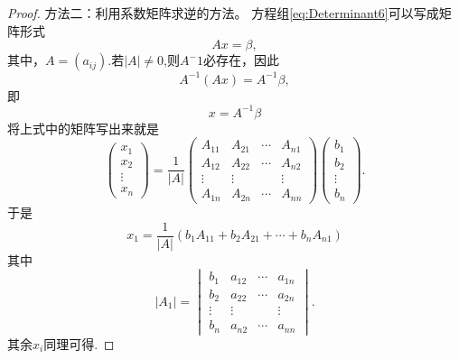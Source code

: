 \begin{proof}
  方法二：利用系数矩阵求逆的方法。
  方程组\eqref{eq:Determinant6}可以写成矩阵形式
  \begin{equation*}
    Ax=\beta,
  \end{equation*}
  其中，$A=(a_{ij})$.若$|A| \neq 0$,则$A^-1$必存在，因此
  \begin{equation*}
    A^{-1}(Ax)=A^{-1}\beta, 
  \end{equation*}
  即
  \begin{equation*}
    x=A^{-1}\beta
  \end{equation*}
  将上式中的矩阵写出来就是
  \begin{equation*}
    \begin{pmatrix}
      x_1\\
      x_2\\
      \vdots\\
      x_n
    \end{pmatrix}=\frac{1}{|A|}
    \begin{pmatrix}
      A_{11} & A_{21} & \cdots & A_{n1}\\
      A_{12} & A_{22} & \cdots & A_{n2}\\
      \vdots & \vdots & & \vdots\\
      A_{1n} & A_{2n} & \cdots & A_{nn}
    \end{pmatrix}
    \begin{pmatrix}
      b_1\\
      b_2\\
      \vdots\\
      b_n
    \end{pmatrix}.
  \end{equation*}
  于是
  \begin{equation*}
    x_1=\frac{1}{|A|}(b_1A_{11}+b_2A_{21}+\cdots+b_nA_{n1})
  \end{equation*}
其中
\begin{equation*}
  |A_1|=
  \begin{vmatrix}
    b_1 & a_{12} & \cdots & a_{1n}\\
    b_2 & a_{22} & \cdots & a_{2n}\\
    \vdots & \vdots & & \vdots\\
    b_n & a_{n2} & \cdots & a_{nn}
  \end{vmatrix}.
\end{equation*}
其余$x_i$同理可得.
\end{proof}

